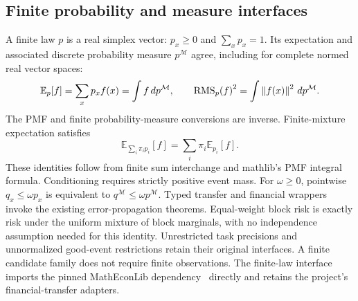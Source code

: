 \documentclass[11pt]{article}
\renewcommand{\lean}[1]{\ignorespaces}
\renewcommand{\leanok}{\ignorespaces}
\begin{document}
\subsection{Finite probability and measure
interfaces}\label{app:finite-probability}
A finite law $p$ is a real simplex vector: $p_x\ge0$ and $\sum_x p_x=1$.
Its expectation and associated discrete probability measure $p^{\mathcal M}$
agree, including for complete normed real vector spaces:
\[
  \mathbb{E}_p[f]=\sum_x p_x f(x)=\int f\,dp^{\mathcal M},\qquad
  {\operatorname{RMS}_p(f)}^2=\int\left\lVert f(x)\right\rVert^2\,dp^{\mathcal M}.
\]
\lean{FreeFoundations.FiniteProbability.integral_eq_expect,
  FreeFoundations.FiniteProbability.rms_sq_eq_integral,
FreeFoundations.FiniteProbability.eLpNorm_eq_ofReal_rms}\leanok{}
The PMF and finite probability-measure conversions are inverse. Finite-mixture
expectation satisfies
\[
  \mathbb{E}_{\sum_i\pi_i p_i}[f]=\sum_i\pi_i\mathbb{E}_{p_i}[f].
\]
\lean{FreeFoundations.FiniteProbability.toPMF_ofPMF,
  FreeFoundations.FiniteProbability.ofPMF_toPMF,
  FreeFoundations.FiniteProbability.toMeasure_ofMeasure,
  FreeFoundations.FiniteProbability.ofMeasure_toMeasure,
FreeFoundations.FiniteProbability.expect_finMixture}\leanok{}
These identities follow from finite sum interchange and mathlib's PMF integral
formula. Conditioning requires strictly positive event mass. For $\omega\ge0$,
pointwise $q_x\le\omega p_x$ is equivalent to
$q^{\mathcal M}\le\omega p^{\mathcal M}$.
\lean{FreeFoundations.FiniteProbability.expect_conditionalOn,
FreeFoundations.FiniteProbability.domination_iff}\leanok{}
Typed transfer and financial wrappers invoke the existing error-propagation
theorems. Equal-weight block risk is exactly risk under the uniform mixture of
block marginals, with no independence assumption needed for this identity.
\lean{FreeFoundations.FiniteProbability.source_target_recovery,
  FreeFoundations.FiniteProbability.marginalRisk_eq_mixture,
FreeFoundations.FiniteProbability.transfer_failure_probability}\leanok{}
Unrestricted task precisions and unnormalized good-event restrictions retain
their original interfaces. A finite candidate family does not require finite
observations. The finite-law interface imports the pinned MathEconLib
dependency~\cite{matheconlib} directly and retains the project's
financial-transfer adapters.
\end{document}
